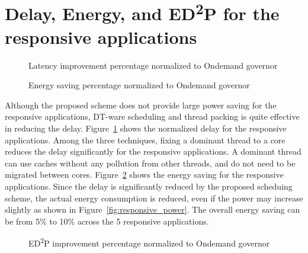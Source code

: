 \section{Delay, Energy, and ED\textsuperscript{2}P for the responsive applications}

\begin{figure}[bt]
\begin{center}
\end{center}
\caption{Latency improvement percentage normalized to Ondemand governor}
\label{fig:responsive_latency_result}
\end{figure}

\begin{figure}[bt]
\begin{center}
\end{center}
\caption{Energy saving percentage normalized to Ondemand governor}
\label{fig:responsive_energy_result}
\end{figure}

Although the proposed scheme does not provide large power saving for the responsive applications, DT-ware scheduling and
thread packing is quite effective in reducing the delay. Figure~\ref{fig:responsive_latency_result} shows 
the normalized delay for the responsive applications. Among the three techniques, fixing a dominant thread to
a core reduces the delay significantly for the responsive applications. A dominant thread can use
caches without any pollution from other threads, and do not need to be migrated between cores.
Figure~\ref{fig:responsive_energy_result} shows the energy saving for the responsive applications. 
Since the delay is significantly reduced by the proposed scheduing scheme, the actual energy consumption
is reduced, even if the power may increase slightly as shown in Figure~\ref{fig:responsive_power}.
The overall energy saving can be from 5\% to 10\% across the 5 responsive applications.

\begin{figure}[bt]
\begin{center}
\end{center}
\caption{ED\textsuperscript{2}P improvement percentage normalized to Ondemand governor}
\label{fig:responsive_EDP_result}
\end{figure}

